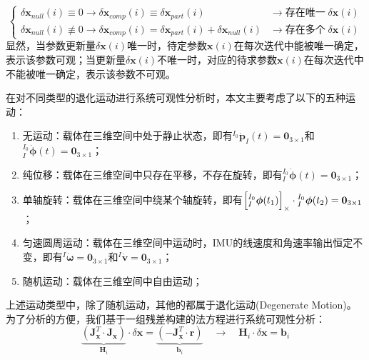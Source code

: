 \begin{equation}
  \begin{cases}
    \delta\boldsymbol{x}_{null}(i)\equiv 0\to \delta\boldsymbol{x}_{comp}(i)\equiv\delta\boldsymbol{x}_{part}(i)                              & \to\mbox{存在唯一}\;\delta\boldsymbol{x}(i) \\
    \delta\boldsymbol{x}_{null}(i)\not\equiv 0\to\delta\boldsymbol{x}_{comp}(i)=\delta\boldsymbol{x}_{part}(i)+\delta\boldsymbol{x}_{null}(i) & \to\mbox{存在多个}\;\delta\boldsymbol{x}(i)
  \end{cases}
\end{equation}
显然，当参数更新量$\delta\boldsymbol{x}(i)$唯一时，待定参数$\boldsymbol{x}(i)$在每次迭代中能被唯一确定，表示该参数可观；当更新量$\delta\boldsymbol{x}(i)$不唯一时，对应的待求参数$\boldsymbol{x}(i)$在每次迭代中不能被唯一确定，表示该参数不可观。

在对不同类型的退化运动进行系统可观性分析时，本文主要考虑了以下的五种运动：
\begin{enumerate}
  \item 无运动：载体在三维空间中处于静止状态，即有${^{I_0}\dot{\boldsymbol{p}}_{I}(t)}=\boldsymbol{0}_{3\times 1}$和${^{I_0}_{I}\dot{\boldsymbol{\phi}}(t)}=\boldsymbol{0}_{3\times 1}$；
  \item 纯位移：载体在三维空间中只存在平移，不存在旋转，即有${^{I_0}_{I}\dot{\boldsymbol{\phi}}(t)}=\boldsymbol{0}_{3\times 1}$；
  \item 单轴旋转：载体在三维空间中绕某个轴旋转，即有$\left[ {^{I_0}_{I}{\boldsymbol{\phi}}(t_1)} \right]_\times\cdot{^{I_0}_{I}{\boldsymbol{\phi}}(t_2)}=\boldsymbol{0}_{3\times 1}$；
  \item 匀速圆周运动：载体在三维空间中运动时，IMU的线速度和角速率输出恒定不变，即有${^{I}\dot{\boldsymbol{\omega}}}=\boldsymbol{0}_{3\times 1}$和${^{I}\dot{\boldsymbol{v}}}=\boldsymbol{0}_{3\times 1}$；
  \item 随机运动：载体在三维空间中自由运动；
\end{enumerate}
上述运动类型中，除了随机运动，其他的都属于退化运动(Degenerate Motion)。为了分析的方便，我们基于一组残差构建的法方程进行系统可观性分析：
\begin{equation}
  \underbrace{\left(
    \boldsymbol{J}_{\boldsymbol{x}}^T\cdot\boldsymbol{J}_{\boldsymbol{x}}
    \right)}_{\boldsymbol{H}_i}
  \cdot\delta\boldsymbol{x}=
  \underbrace{\left( - \boldsymbol{J}_{\boldsymbol{x}}^T\cdot\boldsymbol{r}\right)}
  _{\boldsymbol{b}_i}
  \quad\to\quad
  \boldsymbol{H}_i\cdot\delta\boldsymbol{x}=\boldsymbol{b}_i
\end{equation}

